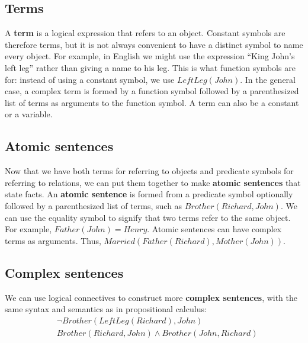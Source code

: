 \subsection{Terms}
A \textbf{term} is a logical expression that refers to an object. Constant symbols are therefore terms, but it is not always convenient to have a distinct symbol to name every object. For example, in English we might use the expression “King John’s left leg” rather than giving a name to his leg. This is what function symbols are for: instead of using a constant symbol, we use $LeftLeg(John)$.\newline\newline
In the general case, a complex term is formed by a function symbol followed by a parenthesized list of terms as arguments to the function symbol. A term can also be a constant or a variable.

\subsection{Atomic sentences}
Now that we have both terms for referring to objects and predicate symbols for referring to relations, we can put them together to make \textbf{atomic sentences} that state facts. An \textbf{atomic sentence}  is formed from a predicate symbol optionally followed by a parenthesized list of terms, such as $Brother(Richard, John)$. We can use the equality symbol to signify that two terms refer to the same object. For example, $Father(John) = Henry$. Atomic sentences can have complex terms as arguments. Thus, $Married(Father(Richard), Mother(John))$.

\subsection{Complex sentences}
We can use logical connectives to construct more \textbf{complex sentences}, with the same syntax and semantics as in propositional calculus:
\[\begin{split}
    & \neg Brother (LeftLeg(Richard), John) \\
    & Brother (Richard, John) \land Brother (John, Richard)
\end{split}\]

